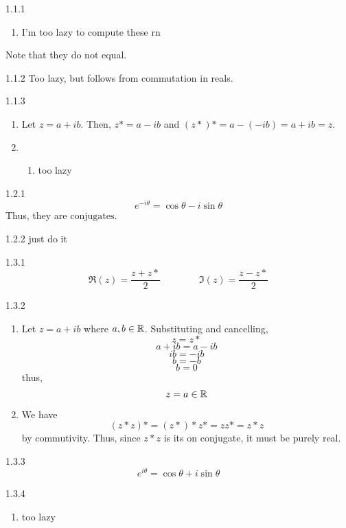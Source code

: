 \begin{Solution}{1.1.1}
	\begin{enumerate}[label = (\alph*)]
		\item I'm too lazy to compute these rn
	\end{enumerate}
	Note that they do not equal.
\end{Solution}
\begin{Solution}{1.1.2}
	Too lazy, but follows from commutation in reals.
\end{Solution}
\begin{Solution}{1.1.3}
	\begin{enumerate}[label = (\alph*)]
		\item Let \(z=a+ib\). Then, \(z\ast = a-ib\) and \((z\ast)\ast = a-(-ib) = a+ib = z\).
		\item \begin{enumerate}[label = (\roman*)]
			\item too lazy
		\end{enumerate}
	\end{enumerate}
\end{Solution}
\begin{Solution}{1.2.1}
	\[e^{-i\theta} = \boxed{\cos\theta-i\sin\theta}\]
	Thus, they are \(\boxed{\text{conjugates}}\).
\end{Solution}
\begin{Solution}{1.2.2}
		just do it
	
\end{Solution}
\begin{Solution}{1.3.1}
	\[\Re(z) = \frac{z+z\ast}{2}\qquad\qquad \Im(z) = \frac{z-z\ast}{2}\]
\end{Solution}
\begin{Solution}{1.3.2}
	\begin{enumerate}[label = (\alph*)]
		\item Let \(z = a+ib\) where \(a,b\in\mathbb{R}\). Substituting and cancelling,
			\[z=z\ast\]
			\[a+ib = a-ib\]
			\[ib = -ib\]
			\[b = -b\]
			\[b=0\]
			thus,
			\[z = a\in\mathbb{R}\]
		\item We have
			\[(z\ast z)\ast = (z\ast)\ast z\ast = zz\ast = z\ast z\]
			by commutivity. Thus, since \(z\ast z\) is its on conjugate, it must be purely real.
	\end{enumerate}
\end{Solution}
\begin{Solution}{1.3.3}
	\[e^{i\theta} = \cos\theta + i\sin\theta\]
\end{Solution}
\begin{Solution}{1.3.4}
	\begin{enumerate}[label = (\alph*)]
		\item too lazy		
	\end{enumerate}
\end{Solution}
